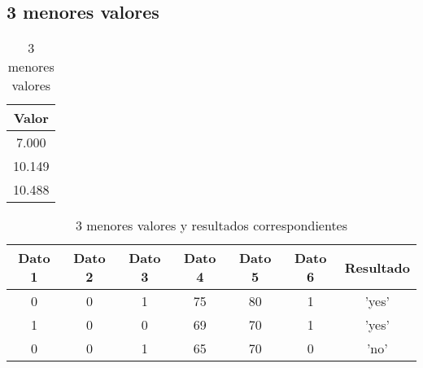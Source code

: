\subsection {3 menores valores} \label{subsec:3 menores valores}

\begin{table}[htbp]
    \centering
    \caption{3 menores valores}
    \label{tab:tres_menores_valores}
    \begin{tabular}{|c|}
    \hline
    \textbf{Valor} \\
    \hline
    7.000 \\
    10.149 \\
    10.488 \\
    \hline
    \end{tabular}
\end{table}

\begin{table}[htbp]
    \centering
    \caption{3 menores valores y resultados correspondientes}
    \label{tab:tres_menores_resultados}
    \begin{tabular}{|c|c|c|c|c|c|c|}
    \hline
    \textbf{Dato 1} & \textbf{Dato 2} & \textbf{Dato 3} & \textbf{Dato 4} & \textbf{Dato 5} & \textbf{Dato 6} & \textbf{Resultado} \\
    \hline
    0 & 0 & 1 & 75 & 80 & 1 & 'yes' \\
    1 & 0 & 0 & 69 & 70 & 1 & 'yes' \\
    0 & 0 & 1 & 65 & 70 & 0 & 'no' \\
    \hline
    \end{tabular}
\end{table}
